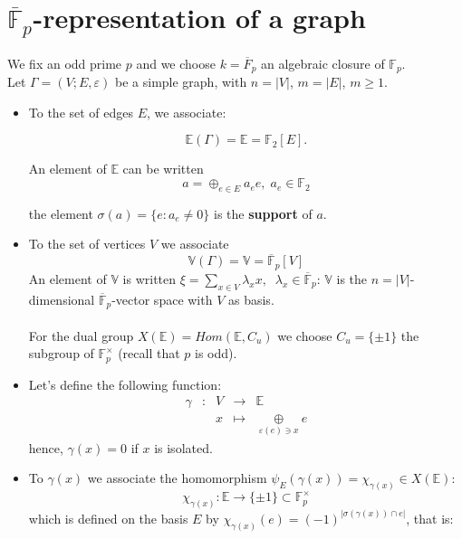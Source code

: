 \documentclass[preprint,12pt,authoryear]{elsarticle}
\theoremstyle{definition}
\begin{document}

\section{$\overline{\mathbb{F}}_p$-representation of  a graph }
We fix an odd prime $p$ and we choose $k= \overline{F}_p$ an algebraic closure of $\mathbb{F}_p$.\\

Let $\Gamma=(V; E, \varepsilon)$ be a simple graph, with $n =\vert V\vert$,  $m =\vert E\vert$,   $m \ge 1$. 
\begin{itemize}
\item[-] To the set of edges $E$, we associate:

$$\mathbb{E}(\Gamma)=\mathbb{E}= \mathbb{F}_2[E].$$

An element of $\mathbb{E}$ can be written
 $$a=\oplus_{e \in E}a_e e, \; a_e \in \mathbb{F}_2$$

the element  $\sigma(a)=\{ e: a_e \neq 0 \}$ is the {\bf support}  of $a$.

 \item[-] To the set of vertices $V$ we associate   
$$\mathbb{V}(\Gamma)=  \mathbb{V}= \overline{\mathbb{F}}_p[V]$$
An element of $\mathbb{V}$ is written 
$ \xi=\sum_{x \in V}\lambda_x x, \;\;  \lambda_x \in \overline{\mathbb{F}}_p $: $\mathbb{V}$ is the $n=|V|$-dimensional
$\overline{\mathbb{F}}_p$-vector space  with $V$ as  basis.\\\\
For the dual group $X(\mathbb{E})=Hom( \mathbb{E}, C_u)$ we choose $C_u=\{\pm1\}$ the  subgroup of  $\mathbb{F}_p^{\times}$ (recall that $p$ is odd).
 \item[-] Let's define the following function:
\begin{equation}\label{gamma}
\begin{array}{ccccc}
\gamma & : & V  & \longrightarrow & \mathbb{E}\\
              &   &  x & \longmapsto      & \underset{\varepsilon(e) \ni x}{\oplus}e 
\end{array}
\end{equation}
hence,  $\gamma(x)=0$ if $x$ is isolated.
 \item[-]   To $\gamma(x)$ we associate the homomorphism $\psi_E(\gamma(x))= \chi_{\gamma(x)} \in X(\mathbb{E})$:
 $$\chi_{\gamma(x)}: \mathbb{E} \longrightarrow \{\pm 1\} \subset \mathbb{F}_p^{\times}$$
which is defined on the basis $E$ by $\chi_{\gamma(x)} (e)= (-1)^{\vert\sigma(\gamma(x))\cap e\vert}$, that is:


\end{itemize}
\end{document}
